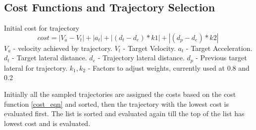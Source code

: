 





\subsection{Cost Functions and Trajectory Selection} \label{traj_Selection}

Initial cost for trajectory
\begin{equation}
cost = |V_a - V_t| + |a_t| + | (d_t - d_e)*k1 | + | (d_p - d_e)*k2 |\
\label{cost_eqn}
\end{equation}
$V_a$ - velocity achieved by trajectory.
$V_t$ - Target Velocity.
$a_t$ - Target Acceleration.
$d_t$ - Target lateral distance.
$d_e$ - Trajectory lateral distance.
$d_p$ - Previous target lateral for trajectory.
$k_1,k_2$ - Factors to adjust weights, currently used at 0.8 and 0.2


Initially all the sampled trajectories are assigned the costs based on the cost function \ref{cost_eqn} and sorted, then the trajectory with the lowest cost is evaluated first. The list is sorted and evaluated again till the top of the list has lowest cost and is evaluated.

